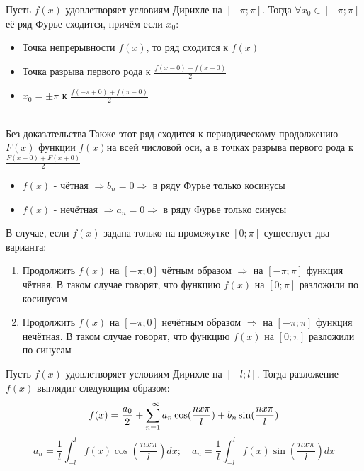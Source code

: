 \begin{Th}
	Пусть $f(x)$ удовлетворяет условиям Дирихле на $[-\pi;\pi]$. Тогда $\forall x_0 \in [-\pi;\pi]$ её ряд Фурье сходится, причём если $x_0$:
	\begin{itemize}
		\item Точка непрерывности $f(x)$, то ряд сходится к $f(x)$
		\item Точка разрыва первого рода к $\frac{f(x-0) + f(x+0)}{2}$
		\item $x_0 = \pm\pi$ к $\frac{f(-\pi+0) + f(\pi-0)}{2}$
	\end{itemize}
	~\\
	Без доказательства
	Также этот ряд сходится к периодическому продолжению $F(x)$ функции $f(x)$на всей числовой оси, а в точках разрыва первого рода к $\frac{F(x-0) + F(x+0)}{2}$
\end{Th}

\begin{Note}
	\begin{itemize}
		\item $f(x)$ - чётная $\Rightarrow b_n = 0 \Rightarrow$ в ряду Фурье только косинусы
		\item $f(x)$ - нечётная $\Rightarrow a_n = 0 \Rightarrow$ в ряду Фурье только синусы
	\end{itemize}
\end{Note}

\begin{Note}
	В случае, если $f(x)$ задана только на промежутке $[0; \pi]$ существует два варианта:
	\begin{enumerate}
		\item Продолжить $f(x)$ на $[-\pi; 0]$ чётным образом $\Rightarrow$ на $[-\pi;\pi]$ функция чётная. В таком случае говорят, что функцию $f(x)$ на $[0;\pi]$ разложили по косинусам
		\item Продолжить $f(x)$ на $[-\pi; 0]$ нечётным образом $\Rightarrow$ на $[-\pi;\pi]$ функция нечётная. В таком случае говорят, что функцию $f(x)$ на $[0;\pi]$ разложили по синусам
	\end{enumerate}
\end{Note}

\begin{Note}
	Пусть $f(x)$ удовлетворяет условиям Дирихле на $[-l;l]$. Тогда разложение $f(x)$ выглядит следующим образом:
	$$
	f(x) = \frac{a_0}{2} + \sum\limits_{n = 1}^{+\infty}{a_n\cos(\frac{nx\pi}{l}) + b_n\sin(\frac{nx\pi}{l})}
	$$
	$$
	a_n = \frac{1}{l}\int_{-l}^{l}f(x)\cos(\frac{nx\pi}{l})dx; \quad a_n = \frac{1}{l}\int_{-l}^{l}f(x)\sin(\frac{nx\pi}{l})dx
	$$
\end{Note}

